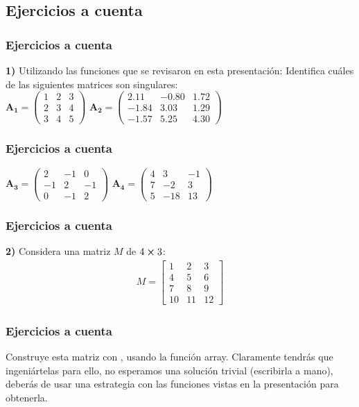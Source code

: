 \subsection{Ejercicios a cuenta}
\begin{frame}
\frametitle{Ejercicios a cuenta}
\textbf{1)} Utilizando las funciones que se revisaron en esta presentación: Identifica cuáles de las siguientes matrices son singulares:
\\
\bigskip
\fontsize{12}{12}\selectfont
$\mathbf{A_{1}} =
\begin{pmatrix}
1 & 2 & 3 \\
2 & 3 & 4 \\
3 & 4 & 5
\end{pmatrix}$
\hspace{1.25cm}
$\mathbf{A_{2}} =
\begin{pmatrix}
2.11 & -0.80 & 1.72 \\
-1.84 & 3.03 & 1.29 \\
-1.57 & 5.25 & 4.30
\end{pmatrix}$
\end{frame}
\begin{frame}
\frametitle{Ejercicios a cuenta}
\fontsize{12}{12}\selectfont
\begin{multicols}{2}
$\mathbf{A_{3}} =
\begin{pmatrix}
2 & -1 & 0 \\
-1 & 2 & -1 \\
0 & -1 & 2
\end{pmatrix}$
\hspace{1.5cm}
$ \mathbf{A_{4}} =
\begin{pmatrix}
4 & 3 & -1 \\
7 & -2 & 3 \\
5 & -18 & 13
\end{pmatrix} $ 
\end{multicols}
\end{frame}
\begin{frame}
\frametitle{Ejercicios a cuenta}
\textbf{2)} Considera una matriz $M$ de $4 \cp 3$:
\begin{align*}
M = 
\begin{bmatrix}
1 & 2 & 3 \\
4 & 5 & 6 \\
7 & 8 & 9 \\
10 & 11 & 12
\end{bmatrix}
\end{align*}
\end{frame}
\begin{frame}
\frametitle{Ejercicios a cuenta}
Construye esta matriz con \python, usando la función array. Claramente tendrás que ingeniártelas para ello, no esperamos una solución trivial (escribirla a mano), deberás de usar una estrategia  con las funciones vistas en la presentación para obtenerla.
\end{frame}
